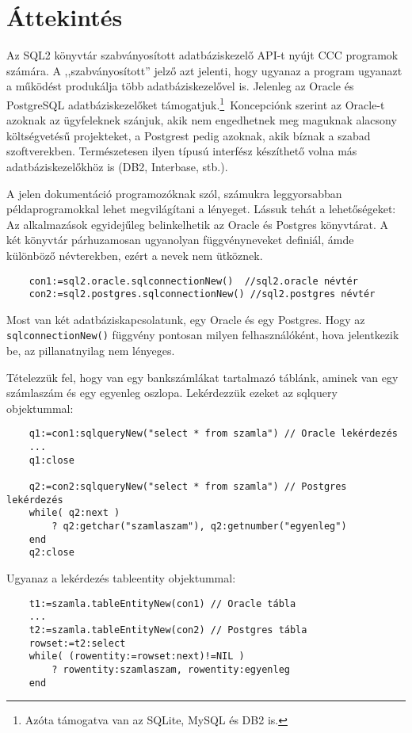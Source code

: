 
\section{Áttekintés}

Az SQL2 könyvtár szabványosított adatbáziskezelő API-t nyújt  
CCC programok számára. A ,,szabványosított'' jelző azt jelenti, 
hogy ugyanaz a program ugyanazt a működést produkálja több 
adatbáziskezelővel is. Jelenleg az Oracle és PostgreSQL 
adatbáziskezelőket támogatjuk.\footnote{Azóta támogatva van
az SQLite, MySQL és DB2 is.}\  
Koncepciónk szerint az Oracle-t azoknak az ügyfeleknek szánjuk, 
akik nem engedhetnek meg maguknak  alacsony költségvetésű 
projekteket, a Postgrest pedig azoknak, akik bíznak a szabad szoftverekben. 
Természetesen ilyen típusú interfész készíthető volna más adatbáziskezelőkhöz 
is (DB2, Interbase, stb.).

A jelen dokumentáció programozóknak szól, számukra
leggyorsabban példaprogramokkal lehet megvilágítani
a lényeget. Lássuk tehát a lehetőségeket:
Az alkalmazások egyidejűleg belinkelhetik az Oracle és Postgres
könyvtárat. A két könyvtár párhuzamosan ugyanolyan függvényneveket 
definiál, ámde különböző  névterekben, ezért a nevek nem ütköznek.

\begin{verbatim}
    con1:=sql2.oracle.sqlconnectionNew()  //sql2.oracle névtér
    con2:=sql2.postgres.sqlconnectionNew() //sql2.postgres névtér
\end{verbatim}


Most van két adatbáziskapcsolatunk, egy Oracle és 
egy  Postgres. Hogy az \verb!sqlconnectionNew()! függvény
pontosan milyen felhasználóként, hova jelentkezik be,
az pillanatnyilag nem lényeges.

Tételezzük fel, 
hogy van egy bankszámlákat tartalmazó táblánk,
aminek van egy számlaszám és egy egyenleg oszlopa.
Lekérdezzük ezeket az sqlquery objektummal:

\begin{verbatim}
    q1:=con1:sqlqueryNew("select * from szamla") // Oracle lekérdezés
    ...
    q1:close

    q2:=con2:sqlqueryNew("select * from szamla") // Postgres lekérdezés
    while( q2:next )
        ? q2:getchar("szamlaszam"), q2:getnumber("egyenleg")
    end
    q2:close
\end{verbatim}

Ugyanaz a lekérdezés tableentity objektummal:

\begin{verbatim}
    t1:=szamla.tableEntityNew(con1) // Oracle tábla
    ...
    t2:=szamla.tableEntityNew(con2) // Postgres tábla
    rowset:=t2:select
    while( (rowentity:=rowset:next)!=NIL )
        ? rowentity:szamlaszam, rowentity:egyenleg 
    end
\end{verbatim}
    
